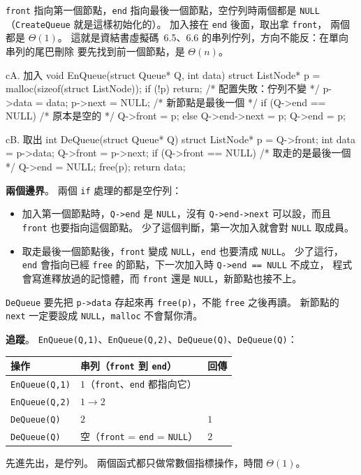 \begin{pastsoln}
\texttt{front} 指向第一個節點，\texttt{end} 指向最後一個節點，空佇列時兩個都是 \texttt{NULL}
（\texttt{CreateQueue} 就是這樣初始化的）。 加入接在 \texttt{end} 後面，取出拿 \texttt{front}，
兩個都是 $\Theta(1)$。 這就是資結書虛擬碼~6.5、6.6 的串列佇列，方向不能反：在單向串列的尾巴刪除
要先找到前一個節點，是 $\Theta(n)$。

\begin{code}{c}{A. 加入}
void EnQueue(struct Queue* Q, int data){
    struct ListNode* p = malloc(sizeof(struct ListNode));
    if (!p)
        return;                 /* 配置失敗：佇列不變 */
    p->data = data;
    p->next = NULL;             /* 新節點是最後一個 */
    if (Q->end == NULL)         /* 原本是空的 */
        Q->front = p;
    else
        Q->end->next = p;
    Q->end = p;
}
\end{code}

\begin{code}{c}{B. 取出}
int DeQueue(struct Queue* Q){
    struct ListNode* p = Q->front;
    int data = p->data;
    Q->front = p->next;
    if (Q->front == NULL)       /* 取走的是最後一個 */
        Q->end = NULL;
    free(p);
    return data;
}
\end{code}

\textbf{兩個邊界}。 兩個 \texttt{if} 處理的都是空佇列：
\begin{itemize}
\item 加入第一個節點時，\texttt{Q->end} 是 \texttt{NULL}，沒有 \texttt{Q->end->next} 可以設，而且
\texttt{front} 也要指向這個節點。 少了這個判斷，第一次加入就會對 \texttt{NULL} 取成員。
\item 取走最後一個節點後，\texttt{front} 變成 \texttt{NULL}，\texttt{end} 也要清成 \texttt{NULL}。
少了這行，\texttt{end} 會指向已經 \texttt{free} 的節點，下一次加入時 \texttt{Q->end == NULL} 不成立，
程式會寫進釋放過的記憶體，而 \texttt{front} 還是 \texttt{NULL}，新節點也接不上。
\end{itemize}
\texttt{DeQueue} 要先把 \texttt{p->data} 存起來再 \texttt{free(p)}，不能 \texttt{free} 之後再讀。
新節點的 \texttt{next} 一定要設成 \texttt{NULL}，\texttt{malloc} 不會幫你清。

\textbf{追蹤}。 \texttt{EnQueue(Q,1)}、\texttt{EnQueue(Q,2)}、\texttt{DeQueue(Q)}、\texttt{DeQueue(Q)}：
\begin{center}
\begin{tabular}{lll}
\toprule
操作 & 串列（\texttt{front} 到 \texttt{end}） & 回傳 \\
\midrule
\texttt{EnQueue(Q,1)} & $1$（\texttt{front}、\texttt{end} 都指向它） & \\
\texttt{EnQueue(Q,2)} & $1 \to 2$ & \\
\texttt{DeQueue(Q)} & $2$ & $1$ \\
\texttt{DeQueue(Q)} & 空（\texttt{front} = \texttt{end} = \texttt{NULL}） & $2$ \\
\bottomrule
\end{tabular}
\end{center}
先進先出，是佇列。 兩個函式都只做常數個指標操作，時間 $\Theta(1)$。
\end{pastsoln}
